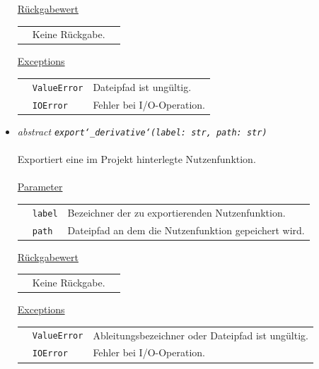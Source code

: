 \documentclass{article}
\begin{document}
\begin{itemize}
\underline{Rückgabewert}\\
\begin{tabular}{lll}
 & Keine Rückgabe.\\
\end{tabular}

\underline{Exceptions}\\
\begin{tabular}{lll}
 & \texttt{ValueError} & Dateipfad ist ungültig.\\
 & \texttt{IOError} & Fehler bei I/O-Operation.\\
\end{tabular}


\item \textit{\flqq{}abstract\frqq} \texttt{\textit{export\char`_derivative\char`(label: str, path: str)}}\\\\
Exportiert eine im Projekt hinterlegte Nutzenfunktion.
\\\\
\underline{Parameter}\\
\begin{tabular}{lll}
 & \texttt{label} & Bezeichner der zu exportierenden Nutzenfunktion.\\
 & \texttt{path} & Dateipfad an dem die Nutzenfunktion gepeichert wird.\\
\end{tabular}

\underline{Rückgabewert}\\
\begin{tabular}{lll}
 & Keine Rückgabe.\\
\end{tabular}

\underline{Exceptions}\\
\begin{tabular}{lll}
 & \texttt{ValueError} & Ableitungsbezeichner oder Dateipfad ist ungültig.\\
 & \texttt{IOError} & Fehler bei I/O-Operation.\\
\end{tabular}
\end{itemize}

\end{document}
